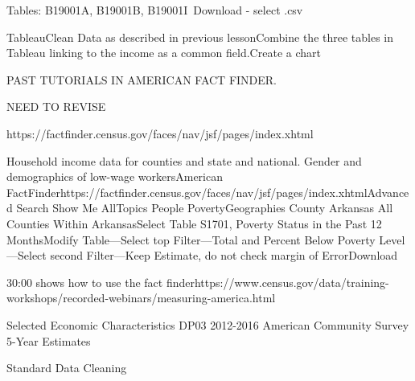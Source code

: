 \documentclass[]{book}
\begin{document}
 Tables: B19001A, B19001B, B19001I~Download - select .csv

TableauClean Data as described in previous lessonCombine the three tables in Tableau linking to the income as a common field.Create a chart

PAST TUTORIALS IN AMERICAN FACT FINDER.

NEED TO REVISE

https://factfinder.census.gov/faces/nav/jsf/pages/index.xhtml

Household income data for counties and state and national. Gender and demographics of low-wage workersAmerican FactFinderhttps://factfinder.census.gov/faces/nav/jsf/pages/index.xhtmlAdvanced Search \textbar{} Show Me AllTopics \textbar{} People \textbar{} PovertyGeographies \textbar{} County \textbar{} Arkansas \textbar{} All Counties Within ArkansasSelect Table S1701, Poverty Status in the Past 12 MonthsModify Table---Select top Filter---Total and Percent Below Poverty Level---Select second Filter---Keep Estimate, do not check margin of ErrorDownload

30:00 shows how to use the fact finderhttps://www.census.gov/data/training-workshops/recorded-webinars/measuring-america.html

Selected Economic Characteristics DP03 2012-2016 American Community Survey 5-Year Estimates

Standard Data Cleaning
\end{document}
